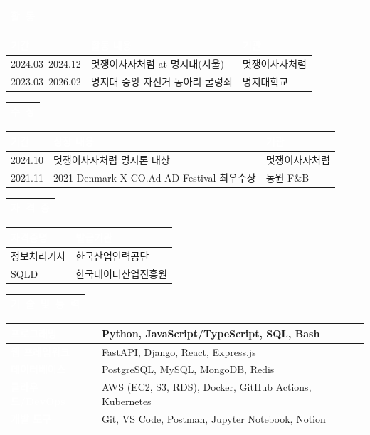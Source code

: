 \documentclass[a4paper, 10pt]{article}
\newcommand{\resumesection}[1]{%
  \vspace{3pt}
  \noindent
  \begin{tabularx}{\textwidth}{|X|}
    \hline
    \rowcolor{navyblue}
    \textcolor{white}{\large\textbf{#1}} \\
    \hline
  \end{tabularx}
  \vspace{1pt}
}
\newcommand{\headercell}[1]{%
  \cellcolor{navyblue}\textcolor{white}{\textbf{#1}}
}
\begin{document}
\resumesection{활\ 동}

\begin{tabularx}{\textwidth}{|m{2.8cm}|X|m{3.5cm}|}
  \hline
  \headercell{기간} & \headercell{활동 내용} & \headercell{기관} \\
  \hline
  2024.03--2024.12 & 멋쟁이사자처럼 at 명지대(서울) & 멋쟁이사자처럼 \\
  \hline
  2023.03--2026.02 & 명지대 중앙 자전거 동아리 굴렁쇠 & 명지대학교 \\
  \hline
\end{tabularx}


\resumesection{수\ 상}

\begin{tabularx}{\textwidth}{|m{2.8cm}|X|m{3.5cm}|}
  \hline
  \headercell{기간} & \headercell{상장 내용} & \headercell{기관} \\
  \hline
  2024.10 & 멋쟁이사자처럼 명지톤 대상 & 멋쟁이사자처럼 \\
  \hline
  2021.11 & 2021 Denmark X CO.Ad AD Festival 최우수상 & 동원 F\&B \\
  \hline
\end{tabularx}


\resumesection{자\ 격\ 증}

\begin{tabularx}{\textwidth}{|X|m{4.5cm}|}
  \hline
  \headercell{자격증명} & \headercell{발급기관} \\
  \hline
  정보처리기사 & 한국산업인력공단 \\
  \hline
  SQLD & 한국데이터산업진흥원 \\
  \hline
\end{tabularx}


\resumesection{기\ 술\ 및\ 능\ 력}

\begin{tabularx}{\textwidth}{|m{2.8cm}|X|}
  \hline
  \headercell{프로그래밍} & Python, JavaScript/TypeScript, SQL, Bash \\
  \hline
  \headercell{웹 프레임워크} & FastAPI, Django, React, Express.js \\
  \hline
  \headercell{데이터베이스} & PostgreSQL, MySQL, MongoDB, Redis \\
  \hline
  \headercell{클라우드/DevOps} & AWS (EC2, S3, RDS), Docker, GitHub Actions, Kubernetes \\
  \hline
  \headercell{개발 도구} & Git, VS Code, Postman, Jupyter Notebook, Notion \\
  \hline
\end{tabularx}
\end{document}

